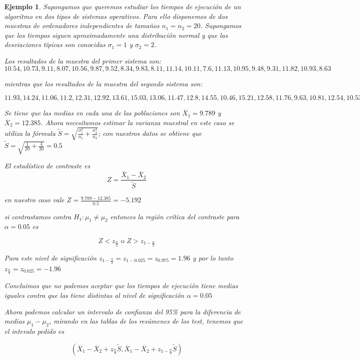 \documentclass[12pt]{report}
\newtheorem{example}[definition]{Ejemplo}
\begin{document}
\begin{example}

Supongamos que queremos estudiar los tiempos de ejecución de un algoritmo en dos  tipos de sistemas operativos. Para ello disponemos de dos muestras de ordenadores independientes de tamaños $n_1=n_2=20$. Supongamos que los tiempos siguen aproximadamente una distribución normal y que las desviaciones típicas son conocidas $\sigma_1=1$ y $\sigma_2=2$.

Los resultados de la muestra del primer sistema son:
$$10.54,10.73,9.11,8.07,10.56,9.87,9.52,8.34,9.83,8.11,11.14,10.11,7.6,11.13,10.95,9.48,9.31,11.82,10.93,8.63$$


mientras que los resultados de la muestra del segundo sistema son:

$$11.93,14.24,11.06,11.2,12.31,12.92,13.61,15.03,13.06,11.47,12.8,14.55,10.46,15.21,12.58,11.76,9.63,10.81,12.54,10.53$$



Se tiene que las medias en cada una de las poblaciones son $\overline{X}_1= 9.789$ y $\overline{X}_2=12.385$. Ahora necesitamos estimar la varianza muestral en este caso se utiliza la fórmula $\tilde{S}=
\sqrt{\frac{\sigma_1^2}{n_1}+
\frac{\sigma_2^2}{n_2}}$; con nuestros datos se obtiene que  $\tilde{S}=\sqrt{\frac{1}{20}+\frac{4}{20}}=0.5$

El estadístico de contraste 
es $$Z=
\frac{\overline{X}_1-\overline{X}_2}{\tilde{S}}$$

en nuestro caso vale $Z=\frac{9.789-12.385}{0.5}=-5.192$


si contrastamos contra $H_1: \mu_1\not=\mu_2$ entonces la región crítica del contraste para $\alpha=0.05$ es


$$Z< z_{\frac{\alpha}{2}} \mbox{ o } Z>z_{1-\frac{\alpha}{2}}$$ 

Para este nivel de significación $z_{1-\frac{\alpha}{2}}=z_{1- 0.025}=z_{0.975}=1.96$ y por lo tanto 
$ z_{\frac{\alpha}{2}}=z_{0.025}=-1.96$

Concluimos que   no podemos aceptar que los tiempos de ejecución tiene medias iguales contra que las tiene distintas al nivel de significación $\alpha=0.05$


Ahora podemos calcular un intervalo de confianza del 95\% para la diferencia de medias $\mu_1-\mu_2$, mirando en las tablas de los resúmenes de los test, tenemos que el intevalo pedido es 


$$\left(\overline{X}_1 -\overline{X}_2
+z_{\frac{\alpha}{2}}\tilde{S},
\overline{X}_1 -\overline{X}_2
+z_{1-\frac{\alpha}{2}}\tilde{S}\right)$$




\end{example}
\end{document}
